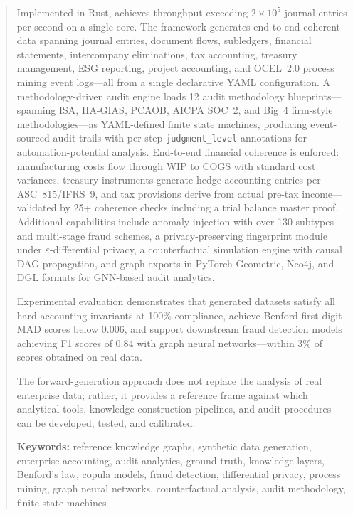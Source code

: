 \begin{abstract}
Implemented in Rust, \system{} achieves throughput exceeding
$2 \times 10^5$ journal entries per second on a single core.  The
framework generates end-to-end coherent data spanning journal entries,
document flows, subledgers, financial statements, intercompany
eliminations, tax accounting, treasury management, ESG reporting,
project accounting, and OCEL~2.0 process mining event logs---all from a
single declarative YAML configuration.
A methodology-driven audit engine loads 12 audit methodology
blueprints---spanning ISA, IIA-GIAS, PCAOB, AICPA SOC~2, and Big~4
firm-style methodologies---as YAML-defined finite state machines,
producing event-sourced audit trails with per-step
\texttt{judgment\_level} annotations for automation-potential analysis.
End-to-end financial coherence is enforced: manufacturing costs flow
through WIP to COGS with standard cost variances, treasury instruments
generate hedge accounting entries per ASC~815/IFRS~9, and tax provisions
derive from actual pre-tax income---validated by 25+ coherence checks
including a trial balance master proof.
Additional capabilities include anomaly injection with over 130
subtypes and multi-stage fraud schemes, a privacy-preserving fingerprint
module under $\varepsilon$-differential privacy, a counterfactual
simulation engine with causal DAG propagation, and graph exports in
PyTorch Geometric, Neo4j, and DGL formats for GNN-based audit analytics.

Experimental evaluation demonstrates that generated datasets satisfy all
hard accounting invariants at 100\% compliance, achieve Benford first-digit
MAD scores below 0.006, and support downstream fraud detection models
achieving F1 scores of 0.84 with graph neural networks---within 3\% of
scores obtained on real data.

The forward-generation approach does not replace the analysis of real
enterprise data; rather, it provides a reference frame against which
analytical tools, knowledge construction pipelines, and audit
procedures can be developed, tested, and calibrated.

\medskip
\noindent\textbf{Keywords:} reference knowledge graphs, synthetic data
generation, enterprise accounting, audit analytics, ground truth,
knowledge layers, Benford's law, copula models, fraud detection,
differential privacy, process mining, graph neural networks,
counterfactual analysis, audit methodology, finite state machines
\end{abstract}
